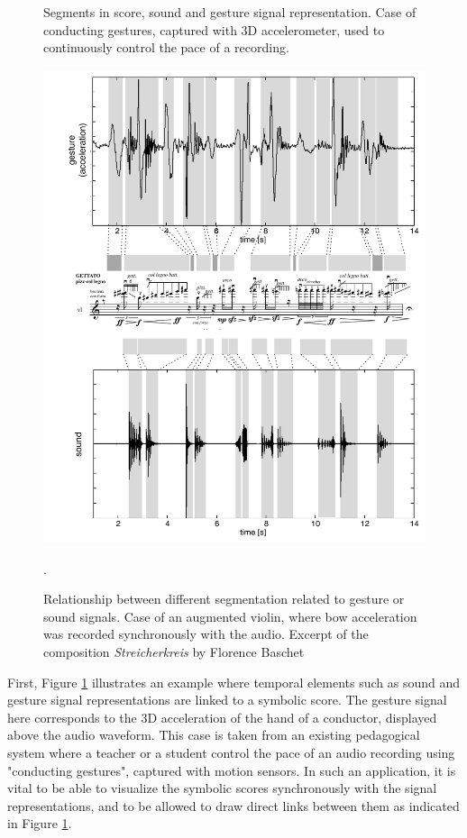 \documentclass[letterpaper, 12pt]{article}
\begin{document}
\begin{figure}
\begin{center}
\caption{Segments in score, sound and gesture signal representation. Case of conducting gestures, captured with 3D accelerometer, used to continuously control the pace of a recording.}
\label{fig:gesture-sound-segments}
\end{center}
\end{figure}


\begin{figure} %
\begin{center}
	\includegraphics[width=1.5\baseimgwidth]{imgs/fig-mapping-gesture-sound4}
\caption{Relationship between different segmentation related to gesture or sound signals. Case of an augmented violin, where bow acceleration was recorded synchronously with the audio. Excerpt of the composition \emph{Streicherkreis} by Florence Baschet}.
\label{fig:gmapping-gesture-sound}
\end{center}
\end{figure}

First, Figure \ref{fig:gesture-sound-segments} illustrates an example where temporal elements such as sound and gesture signal representations are linked to a symbolic score. The gesture signal here corresponds to the 3D acceleration of the hand of a conductor, displayed above the audio waveform. This case is taken from an existing pedagogical system \cite{bevilacqua_nime07} where a teacher or a student control the pace of an audio recording using "conducting gestures", captured with motion sensors. In such an application, it is vital to be able to visualize the symbolic scores synchronously with the signal representations, and to be allowed to draw direct links between them as indicated in Figure \ref{fig:gesture-sound-segments}.
\end{document}
